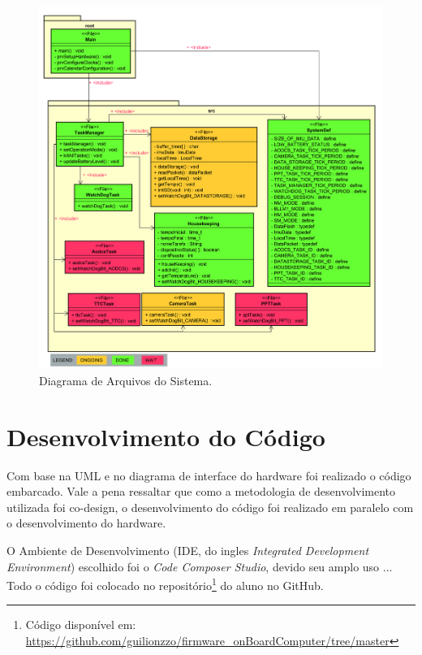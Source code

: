 \begin{itemize}
\begin{figure}[h]
	\centering
	\caption{Diagrama de Arquivos do Sistema.}
	\includegraphics[keepaspectratio=true,scale=0.3]{figuras/CSS.png}
	
	\label{uml_da}
\end{figure}

\end{itemize}


\section{Desenvolvimento do Código}

Com base na UML e no diagrama de interface do hardware foi realizado o código embarcado. Vale a pena ressaltar que como a metodologia de desenvolvimento utilizada foi co-design, o desenvolvimento do código foi realizado em paralelo com o desenvolvimento do hardware. 

O Ambiente de Desenvolvimento (IDE, do ingles \textit{Integrated Development Environment}) escolhido foi o \textit{Code Composer Studio}, devido seu amplo uso ... Todo o código foi colocado no repositório\footnote{Código disponível em: \url{https://github.com/guilionzzo/firmware_onBoardComputer/tree/master}} do aluno no GitHub. 

